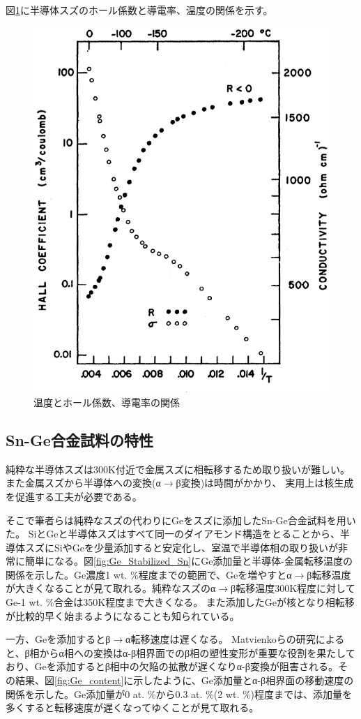 図\ref{fig:conductivity}に半導体スズのホール係数と導電率、温度の関係を示す。
\begin{figure}[!h]
    \begin{center}
   \includegraphics[width=0.6\hsize]{Introduction/conductivity.eps}
  \end{center}
  \caption{温度とホール係数、導電率の関係\cite{Kohnke}}
  \label{fig:conductivity}
\end{figure}

\subsection{Sn-Ge合金試料の特性}
純粋な半導体スズは300K付近で金属スズに相転移するため取り扱いが難しい。
また金属スズから半導体への変換(α$\to$β変換)は時間がかかり、%
実用上は核生成を促進する工夫が必要である。

そこで筆者らは純粋なスズの代わりにGeをスズに添加したSn-Ge合金試料を用いた。
SiとGeと半導体スズはすべて同一のダイアモンド構造をとることから、半導体スズにSiやGeを少量添加すると安定化し\cite{Ewald1954,Gallerneault1983}、室温で半導体相の取り扱いが非常に簡単になる。図\ref{fig:Ge_Stabilized_Sn}にGe添加量と半導体-金属転移温度の関係を示した\cite{Vnuk1984}。Ge濃度1 wt. \%程度までの範囲で、Geを増やすとα$\to$β転移温度が大きくなることが見て取れる。純粋なスズのα$\to$β転移温度300K程度に対してGe-1 wt. \%合金は350K程度まで大きくなる。
また添加したGeが核となり相転移が比較的早く始まるようになることも知られている\cite{Zeng2014}。

一方、Geを添加するとβ$\to$α転移速度は遅くなる\cite{Matvienko,Zeng2014}。
Matvienkoらの研究\cite{Matvienko}によると、β相からα相への変換はα-β相界面でのβ相の塑性変形が重要な役割を果たしており、Geを添加するとβ相中の欠陥の拡散が遅くなりα-β変換が阻害される。その結果、図\ref{fig:Ge_content}に示したように、Ge添加量とα-β相界面の移動速度の関係を示した\cite{Matvienko}。Ge添加量が0 at. \%から0.3 at. \%(2 wt. \%)程度までは、添加量を多くすると転移速度が遅くなってゆくことが見て取れる。

